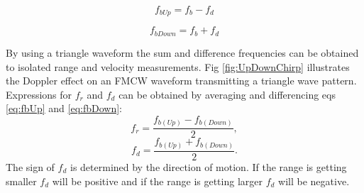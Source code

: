 \begin{equation}
\label{eq:fbUp}
f_{bUp}=f_b - f_d
\end{equation}

\begin{equation}
\label{eq:fbDown}
f_{bDown}=f_b + f_d
\end{equation}

By using a triangle waveform the sum and difference frequencies can be obtained to isolated range and velocity measurements. 
Fig \ref{fig:UpDownChirp} illustrates the Doppler effect on an FMCW waveform transmitting a triangle wave pattern.  
Expressions for $f_r$ and $f_d$ can be obtained by averaging and differencing eqs  \ref{eq:fbUp} and \ref{eq:fbDown}:
 \begin{equation}
 \label{eq:fr}
 f_r = \frac{f_{b(Up)}-f_{b(Down)}}{2},
 \end{equation}
 \begin{equation}
\label{eq:fd}
f_d = \frac{f_{b(Up)}+f_{b(Down)}}{2}.
\end{equation}
The sign of $f_d$ is determined by the direction of motion. If the range is getting smaller $f_d$ will be positive 
and if the range is getting larger $f_d$ will be negative. 

